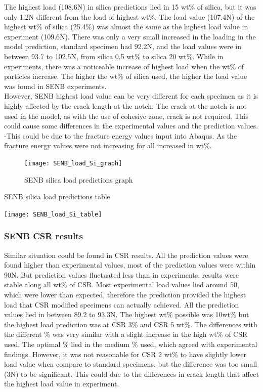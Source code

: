 \documentclass[numbers=noendperiod,chapterprefix=on]{icldt} %
\begin{document}
{The highest load (108.6N) in silica predictions lied in 15 wt\% of silica, but it was only 1.2N different from the load of highest wt\%. The load value (107.4N) of the highest wt\% of silica (25.4\%) was almost the same as the highest load value in experiment (109.6N). There was only a very small increased in the loading in the model prediction, standard specimen had 92.2N, and the load values were in between 93.7 to 102.5N, from silica 0.5 wt\% to silica 20 wt\%. While in experiments, there was a noticeable increase of highest load when the wt\% of particles increase. The higher the wt\% of silica used, the higher the load value was found in SENB experiments.
\\
However, SENB highest load value can be very different for each specimen as it is highly affected by the crack length at the notch. The crack at the notch is not used in the model, as with the use of cohesive zone, crack is not required. This could cause some differences in the experimental values and the prediction values.
-This could be due to the fracture energy values input into Abaqus. As the fracture energy values were not increasing for all increased in wt\%.

\begin{figure}[!hp]
\centering
\texttt{[image: SENB\_load\_Si\_graph]}\label{SENB_load_Si_graph}
\caption{SENB silica load predictions graph}
\end{figure}
\FloatBarrier

 \begin{table}
 \centering
 \caption{SENB silica load predictions table}\label{SENB_load_Si_table}
 \texttt{[image: SENB\_load\_Si\_table]}
 \end{table}
 \FloatBarrier  

\subsubsection{SENB CSR results}
Similar situation could be found in CSR results. All the prediction values were found higher than experimental values, most of the prediction values were within 90N. But prediction values fluctuated less than in experiments, results were stable along all wt\% of CSR. Most experimental load values lied around 50, which were lower than expected, therefore the prediction provided the highest load that CSR modified specimens can actually achieved. 
All the prediction values lied in between 89.2 to 93.3N. The highest wt\% possible was 10wt\% but the highest load prediction was at CSR 3\% and CSR 5 wt\%. The differences with the different \% was very similar with a slight increase in the high wt\% of CSR used.  The optimal \% lied in the medium \% used, which agreed with experimental findings. However, it was not reasonable for CSR 2 wt\% to have slightly lower load value when compare to standard specimens, but the difference was too small (3N) to be significant. This could due to the differences in crack length that affect the highest load value in experiment. 

}
\end{document}
